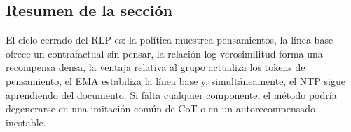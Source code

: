 \subsection{Resumen de la sección}

El ciclo cerrado del RLP es: la política muestrea pensamientos, la línea base ofrece un contrafactual sin pensar, la relación log-verosimilitud forma una recompensa densa, la ventaja relativa al grupo actualiza los tokens de pensamiento, el EMA estabiliza la línea base y, simultáneamente, el NTP sigue aprendiendo del documento. Si falta cualquier componente, el método podría degenerarse en una imitación común de CoT o en un autorecompensado inestable.

